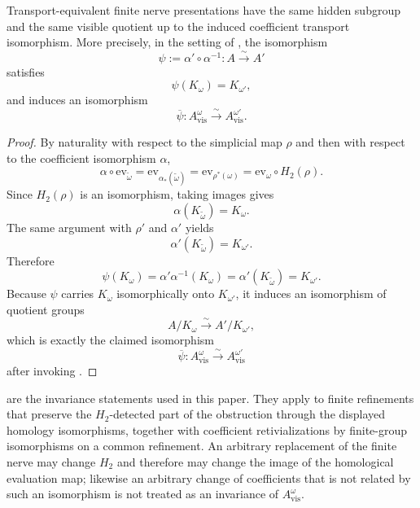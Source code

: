\begin{theorem}\label{thm:visible-quotient-transport-invariance}
Transport-equivalent finite nerve presentations have the same hidden subgroup
and the same visible quotient up to the induced coefficient transport
isomorphism. More precisely, in the setting of
, the isomorphism
\[
\psi:=\alpha'\circ \alpha^{-1}:A\xrightarrow{\sim} A'
\]
satisfies
\[
\psi(K_{\omega})=K_{\omega'},
\]
and induces an isomorphism
\[
\overline\psi:A_{\mathrm{vis}}^{\omega}\xrightarrow{\sim}
A_{\mathrm{vis}}^{\omega'}.
\]
\end{theorem}

\begin{proof}
By naturality with respect to the simplicial map $\rho$ and then with respect
to the coefficient isomorphism $\alpha$,
\[
\alpha\circ \mathrm{ev}_{\widetilde\omega}
=
\mathrm{ev}_{\alpha_*(\widetilde\omega)}
=
\mathrm{ev}_{\rho^*(\omega)}
=
\mathrm{ev}_{\omega}\circ H_2(\rho).
\]
Since $H_2(\rho)$ is an isomorphism, taking images gives
\[
\alpha(K_{\widetilde\omega})=K_{\omega}.
\]
The same argument with $\rho'$ and $\alpha'$ yields
\[
\alpha'(K_{\widetilde\omega})=K_{\omega'}.
\]
Therefore
\[
\psi(K_{\omega})
=
\alpha'\alpha^{-1}(K_{\omega})
=
\alpha'(K_{\widetilde\omega})
=
K_{\omega'}.
\]
Because $\psi$ carries $K_{\omega}$ isomorphically onto $K_{\omega'}$, it
induces an isomorphism of quotient groups
\[
A/K_{\omega}\xrightarrow{\sim} A'/K_{\omega'},
\]
which is exactly the claimed isomorphism
\[
\overline\psi:A_{\mathrm{vis}}^{\omega}\xrightarrow{\sim}
A_{\mathrm{vis}}^{\omega'}
\]
after invoking .
\end{proof}

\begin{remark}\label{rem:no-naive-visible-quotient-invariance}
are the invariance statements used in this paper. They apply to finite
refinements that preserve the $H_2$-detected part of the obstruction through
the displayed homology isomorphisms, together with coefficient retivializations
by finite-group isomorphisms on a common refinement. An arbitrary replacement
of the finite nerve may change $H_2$ and therefore may change the image of the
homological evaluation map; likewise an arbitrary change of coefficients that is
not related by such an isomorphism is not treated as an invariance of
$A_{\mathrm{vis}}^{\omega}$.
\end{remark}

